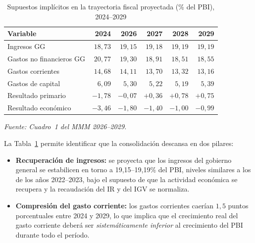 \documentclass[12pt, a4paper]{article}
\newcommand{\emp}[1]{\textbf{#1}}
\newcommand{\nota}[1]{\textit{\small #1}}
\begin{document}
\begin{table}[h!]
\centering
\caption{Supuestos implícitos en la trayectoria fiscal proyectada
         (\% del PBI), 2024--2029}
\label{tab:supuestos}
\setlength{\tabcolsep}{9pt}
\renewcommand{\arraystretch}{1.25}
\begin{tabular}{lrrrrr}
\toprule
\rowcolor{headgray}
\textbf{Variable} & \textbf{2024} & \textbf{2026} & \textbf{2027}
                  & \textbf{2028} & \textbf{2029} \\
\midrule
Ingresos GG & $18{,}73$ & $19{,}15$ & $19{,}18$ & $19{,}19$ & $19{,}19$ \\
\rowcolor{rowgray}
Gastos no financieros GG & $20{,}77$ & $19{,}30$ & $18{,}91$ & $18{,}51$ & $18{,}55$ \\
Gastos corrientes & $14{,}68$ & $14{,}11$ & $13{,}70$ & $13{,}32$ & $13{,}16$ \\
\rowcolor{rowgray}
Gastos de capital & $6{,}09$ & $5{,}30$ & $5{,}22$ & $5{,}19$ & $5{,}39$ \\
Resultado primario & $-1{,}78$ & $-0{,}07$ & $+0{,}36$ & $+0{,}78$ & $+0{,}75$ \\
\rowcolor{rowgray}
Resultado económico & $-3{,}46$ & $-1{,}80$ & $-1{,}40$ & $-1{,}00$ & $-0{,}99$ \\
\bottomrule
\end{tabular}
\smallskip

\nota{Fuente: Cuadro~1 del MMM 2026--2029.}
\end{table}

\noindent La Tabla~\ref{tab:supuestos} permite identificar que la consolidación
descansa en dos pilares:

\begin{itemize}[leftmargin=1.5em]
    \item \emp{Recuperación de ingresos:} se proyecta que los ingresos del
          gobierno general se estabilicen en torno a 19{,}15--19{,}19\% del
          PBI, niveles similares a los de los años 2022--2023, bajo el supuesto
          de que la actividad económica se recupera y la recaudación del IR y
          del IGV se normaliza.
    \item \emp{Compresión del gasto corriente:} los gastos corrientes caerían
          $1{,}5$ puntos porcentuales entre 2024 y 2029, lo que implica que
          el crecimiento real del gasto corriente deberá ser
          \emph{sistemáticamente inferior} al crecimiento del PBI durante
          todo el período.
\end{itemize}
\end{document}
